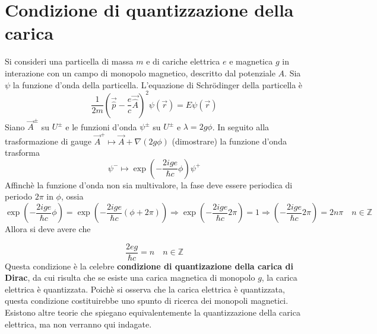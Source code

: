 \section{Condizione di quantizzazione della carica}
Si consideri una particella di massa $m$ e di cariche elettrica $e$ e magnetica
$g$ in interazione con un campo di monopolo magnetico, descritto dal potenziale
$A$. Sia $\psi$ la funzione d'onda della particella. L'equazione di Schrödinger
della particella è
\begin{equation}
   \frac{1}{2m}\left( \vec{\hat{p}} - \frac{e}{c} \vec{\hat{A}} \right)^2 \psi(\vec r) = E\psi(\vec r)
\end{equation}
Siano $\vec A^\pm$ su $U^\pm$ e le funzioni d'onda $\psi^\pm$ su $U^\pm$ e $\lambda =2g\phi$.
In seguito alla trasformazione di gauge $ \vec A^+ \mapsto \vec A + \nabla (2g\phi)$ (dimostrare)
la funzione d'onda trasforma
$$ \psi^- \mapsto \exp \left( - \frac{2ige}{\hbar c} \phi \right) \psi^+$$
Affinchè la funzione d'onda non sia multivalore, la fase deve essere periodica di
periodo $2\pi$ in $\phi$, ossia
$$
   \exp \left( - \frac{2ige}{\hbar c} \phi \right)
      = \exp \left( - \frac{2ige}{\hbar c} (\phi + 2\pi) \right)
   \Rightarrow
   \exp \left( - \frac{2ige}{\hbar c} 2\pi \right) = 1
   \Rightarrow
   \left( - \frac{2ige}{\hbar c} 2\pi \right) = 2n\pi \quad n \in \mathbb{Z}
$$
Allora si deve avere che

\begin{equation}\label{eq:diracquantumcharge}
   \boxed{
      \frac{2eg}{\hbar c} = n \quad  n \in \mathbb{Z}
   }
\end{equation}
Questa condizione è la celebre \textbf{condizione di quantizazione della carica
di Dirac}, da cui risulta che se esiste una carica magnetica di monopolo $g$,
la carica elettrica è quantizzata. Poichè si osserva che la carica elettrica è
quantizzata, questa condizione costituirebbe uno spunto di ricerca dei monopoli
magnetici.\\
Esistono altre teorie che spiegano equivalentemente la quantizzazione della carica
elettrica, ma non verranno qui indagate.\\
